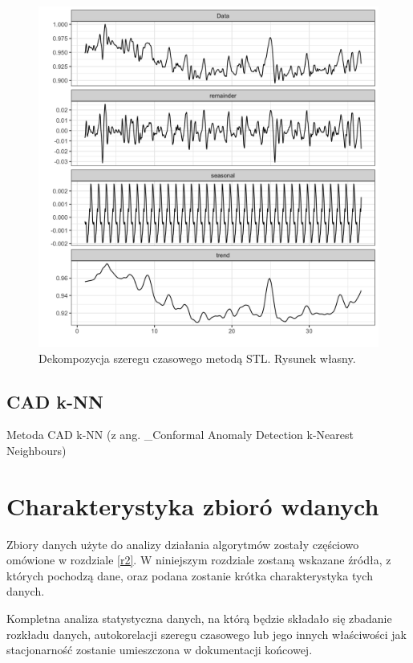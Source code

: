 \documentclass{article}
\begin{document}
\begin{figure}
\centering
\includegraphics[width=\textwidth]{./images/stl-usage.png}
\caption{Dekompozycja szeregu czasowego metodą STL. Rysunek własny.}
\end{figure}

\hypertarget{cad-k-nn}{%
\subsection{CAD k-NN}\label{cad-k-nn}}

Metoda CAD k-NN (z ang. \_Conformal Anomaly Detection k-Nearest
Neighbours)


\section{Charakterystyka zbioró wdanych \label{r5}}

Zbiory danych użyte do analizy działania algorytmów zostały częściowo
omówione w rozdziale \ref{r2}. W niniejszym rozdziale zostaną wskazane
źródła, z których pochodzą dane, oraz podana zostanie krótka
charakterystyka tych danych.

Kompletna analiza statystyczna danych, na którą będzie składało się
zbadanie rozkładu danych, autokorelacji szeregu czasowego lub jego
innych właściwości jak stacjonarność zostanie umieszczona w dokumentacji
końcowej.
\end{document}
